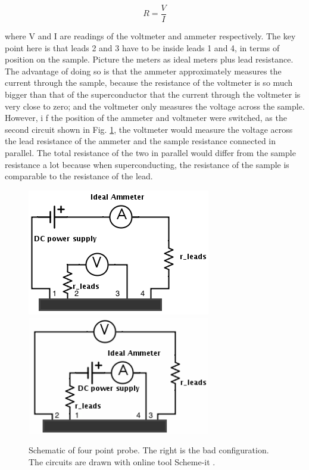 \documentclass[prb,preprint]{revtex4-1}
\begin{document}
\begin{equation}
R=\frac{V}{I}
\label{ohm}
\end{equation}

where V and I are readings of the voltmeter and ammeter respectively. The key point here is that leads 2 and 3 have to be inside leads 1 and 4, in terms of position on the sample. Picture the meters as ideal meters plus lead resistance. The advantage of doing so is that the ammeter approximately measures the current through the sample, because the resistance of the voltmeter is so much bigger than that of the superconductor that the current through the voltmeter is very close to zero; and the voltmeter only measures the voltage across the sample. However, i f the position of the ammeter and voltmeter were switched, as the second circuit shown in Fig. \ref{fpp}, the voltmeter would measure the voltage across the lead resistance of the ammeter and the sample resistance connected in parallel. The total resistance of the two in parallel would differ from the sample resistance a lot because when superconducting, the resistance of the sample is comparable to the resistance of the lead. \\

\begin{figure}[h]
\centering
\includegraphics[width=8cm]{fourpointprobe2.png}
\includegraphics[width=8cm]{fourpointprobe3.png}
\caption{Schematic of four point probe. The right is the bad configuration. The circuits are drawn with online tool Scheme-it \cite{drawcircuit}.}
\label{fpp}
\end{figure}
\end{document}

